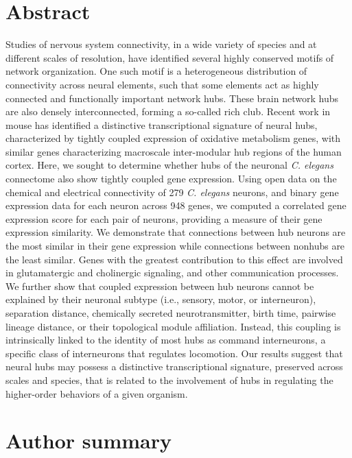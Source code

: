 \documentclass[10pt,letterpaper]{article}
\begin{document}
\section*{Abstract}
Studies of nervous system connectivity, in a wide variety of species and at different scales of resolution, have identified several highly conserved motifs of network organization.
One such motif is a heterogeneous distribution of connectivity across neural elements, such that some elements act as highly connected and functionally important network hubs.
These brain network hubs are also densely interconnected, forming a so-called rich club.
Recent work in mouse has identified a distinctive transcriptional signature of neural hubs, characterized by tightly coupled expression of oxidative metabolism genes, with similar genes characterizing macroscale inter-modular hub regions of the human cortex.
Here, we sought to determine whether hubs of the neuronal \textit{C. elegans} connectome also show tightly coupled gene expression.
Using open data on the chemical and electrical connectivity of 279 \textit{C. elegans} neurons, and binary gene expression data for each neuron across 948 genes, we computed a correlated gene expression score for each pair of neurons, providing a measure of their gene expression similarity.
We demonstrate that connections between hub neurons are the most similar in their gene expression while connections between nonhubs are the least similar.
Genes with the greatest contribution to this effect are involved in glutamatergic and cholinergic signaling, and other communication processes.
We further show that coupled expression between hub neurons cannot be explained by their neuronal subtype (i.e., sensory, motor, or interneuron), separation distance, chemically secreted neurotransmitter, birth time, pairwise lineage distance, or their topological module affiliation.
Instead, this coupling is intrinsically linked to the identity of most hubs as command interneurons, a specific class of interneurons that regulates locomotion.
Our results suggest that neural hubs may possess a distinctive transcriptional signature, preserved across scales and species, that is related to the involvement of hubs in regulating the higher-order behaviors of a given organism.

\section*{Author summary}
\end{document}
